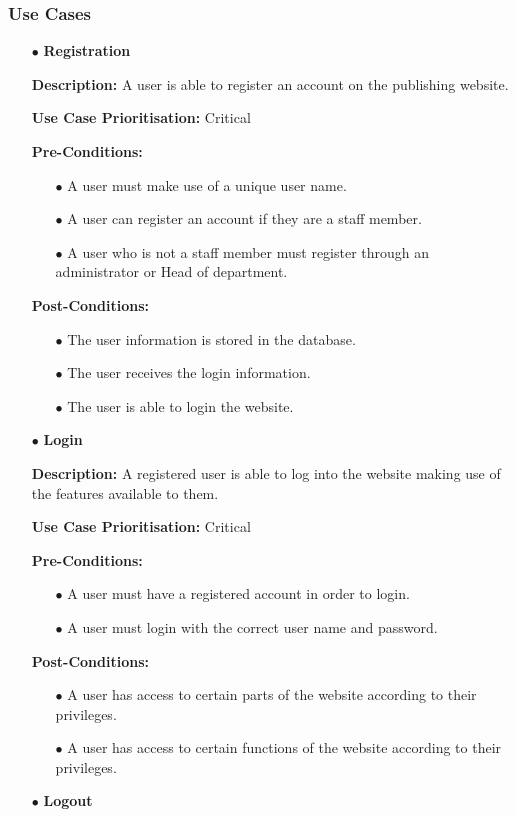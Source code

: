 \documentclass[a4paper,12pt]{article}
\begin{document}
	\subsubsection{Use Cases}
	\begin{itemize}
		\item[$\bullet$]\textbf{Registration}\newline
		
		\textbf{Description:} A user is able to register an account on the publishing website.\newline
		
		\textbf{Use Case Prioritisation:} Critical\newline
		
		\textbf{Pre-Conditions:}
			\begin{itemize}
				\item[$\bullet$]A user must make use of a unique user name.
				\item[$\bullet$]A user can register an account if they are a staff member.
			\item[$\bullet$]A user who is not a staff member must register through an administrator or Head of department.
			\\
		\end{itemize}
		\textbf{Post-Conditions: }
		\begin{itemize}
			\item[$\bullet$]The user information is stored in the database.
			\item[$\bullet$]The user receives the login information.
			\item[$\bullet$]The user is able to login the website.
			\\
		\end{itemize}
		\newpage
		\item[$\bullet$]\textbf{Login}\newline
		
		\textbf{Description:} A registered user is able to log into the website making use of the features available to them.\newline
		
		\textbf{Use Case Prioritisation:} Critical\newline
		
		\textbf{Pre-Conditions:}
		\begin{itemize}
			\item[$\bullet$]A user must have a registered account in order to login.
			\item[$\bullet$]A user must login with the correct user name and password.
			\\
		\end{itemize}
		\textbf{Post-Conditions: }
		\begin{itemize}
			\item[$\bullet$]A user has access to certain parts of the website according to their privileges.
			\item[$\bullet$]A user has access to certain functions of the website according to their privileges.
			\\
		\end{itemize}
		\item[$\bullet$]\textbf{Logout}\newline
	

\end{itemize}
\end{document}
